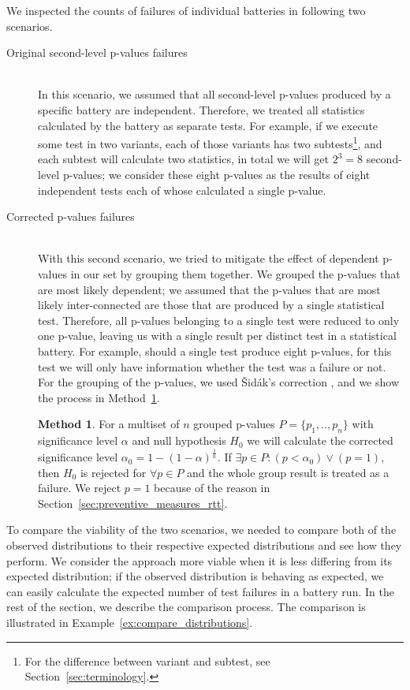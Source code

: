 \documentclass[
	digital,    %
	oneside,    %
	color,
	11pt,
	nocover,
	notable,
	nolof,
	nolot,
]{fithesis3}
\theoremstyle{definition}
\newtheorem{method}{Method}[section]
\theoremstyle{remark}
\begin{document}
We inspected the counts of failures of individual batteries in following two scenarios.

\begin{description}
\item[Original second-level p-values failures] \hfill \\
In this scenario, we assumed that all second-level p-values produced by a specific battery are independent. Therefore, we treated all statistics calculated by the battery as separate tests. For example, if we execute some test in two variants, each of those variants has two subtests\footnote{For the difference between variant and subtest, see Section~\ref{sec:terminology}.}, and each subtest will calculate two statistics, in total we will get $2^3=8$ second-level p-values; we consider these eight p-values as the results of eight independent tests each of whose calculated a single p-value. 
\pagebreak
\item[Corrected p-values failures] \hfill \\
With this second scenario, we tried to mitigate the effect of dependent p-values in our set by grouping them together. We grouped the p-values that are most likely dependent; we assumed that the p-values that are most likely inter-connected are those that are produced by a single statistical test. Therefore, all p-values belonging to a single test were reduced to only one p-value, leaving us with a single result per distinct test in a statistical battery. For example, should a single test produce eight p-values, for this test we will only have information whether the test was a failure or not. For the grouping of the p-values, we used Šidák's correction \cite{sidak-corr}, and we show the process in Method~\ref{def:sidak}.

\begin{method}
\label{def:sidak}
For a multiset of $n$ grouped p-values $P = \{p_1,..,p_n\}$ with significance level $\alpha$ and null hypothesis $H_0$ we will calculate the corrected significance level $\alpha_0 = 1 - (1 - \alpha)^{\frac{1}{n}}$. If $\exists p \in P : (p < \alpha_0) \vee (p = 1) $, then $H_0$ is rejected for $\forall p \in P$ and the whole group result is treated as a failure. We reject $p=1$ because of the reason in Section~\ref{sec:preventive_measures_rtt}.
\end{method}

\end{description}

To compare the viability of the two scenarios, we needed to compare both of the observed distributions to their respective expected distributions and see how they perform. We consider the approach more viable when it is less differing from its expected distribution; if the observed distribution is behaving as expected, we can easily calculate the expected number of test failures in a battery run. In the rest of the section, we describe the comparison process. The comparison is illustrated in Example~\ref{ex:compare_distributions}.
\end{document}

